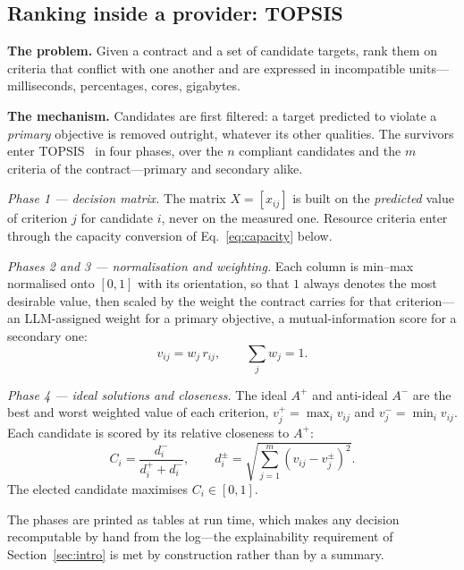 \documentclass[conference]{IEEEtran}
\begin{document}
\subsection{Ranking inside a provider: TOPSIS}
\label{sec:topsis}

\textbf{The problem.} Given a contract and a set of candidate targets, rank
them on criteria that conflict with one another and are expressed in
incompatible units---milliseconds, percentages, cores, gigabytes.

\textbf{The mechanism.} Candidates are first filtered: a target predicted to
violate a \emph{primary} objective is removed outright, whatever its other
qualities. The survivors enter TOPSIS~\cite{hwang1981} in four phases, over
the $n$ compliant candidates and the $m$ criteria of the contract---primary
and secondary alike.

\emph{Phase 1 --- decision matrix.} The matrix $X = [x_{ij}]$ is built on the
\emph{predicted} value of criterion $j$ for candidate $i$, never on the
measured one. Resource criteria enter through the capacity conversion of
Eq.~\eqref{eq:capacity} below.

\emph{Phases 2 and 3 --- normalisation and weighting.} Each column is
min--max normalised onto $[0,1]$ with its orientation, so that $1$ always
denotes the most desirable value, then scaled by the weight the contract
carries for that criterion---an LLM-assigned weight for a primary objective,
a mutual-information score for a secondary one:
\begin{equation}
v_{ij} = w_j \, r_{ij}, \qquad \textstyle\sum_j w_j = 1 .
\label{eq:weight}
\end{equation}

\emph{Phase 4 --- ideal solutions and closeness.} The ideal $A^{+}$ and
anti-ideal $A^{-}$ are the best and worst weighted value of each criterion,
$v_j^{+} = \max_i v_{ij}$ and $v_j^{-} = \min_i v_{ij}$. Each candidate is
scored by its relative closeness to $A^{+}$:
\begin{equation}
C_i = \frac{d_i^{-}}{d_i^{+} + d_i^{-}}, \qquad
d_i^{\pm} = \sqrt{\textstyle\sum_{j=1}^{m} \left(v_{ij} - v_j^{\pm}\right)^2 }.
\label{eq:topsis}
\end{equation}
The elected candidate maximises $C_i \in [0,1]$.

The phases are printed as tables at run time, which makes any decision
recomputable by hand from the log---the explainability requirement of
Section~\ref{sec:intro} is met by construction rather than by a summary.
\end{document}
